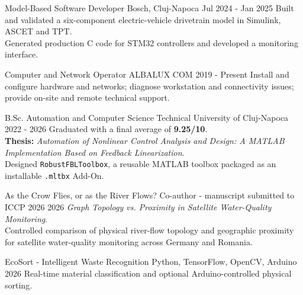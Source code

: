 \documentclass[10pt]{spidercv}
\begin{document}

\begin{MainPart}

  \Experience
    {\ColorHighlight}
    {Model-Based Software Developer}
    {Bosch, Cluj-Napoca}
    {\textcolor{\ColorTextMain}{Jul 2024 - Jan 2025}}
    {Built and validated a six-component electric-vehicle drivetrain model in Simulink, ASCET and TPT.\\
     Generated production C code for STM32 controllers and developed a monitoring interface.}

  \Experience
    {\ColorHighlight}
    {Computer and Network Operator}
    {ALBALUX COM}
    {\textcolor{\ColorTextMain}{2019 - Present}}
    {Install and configure hardware and networks; diagnose workstation and connectivity issues; provide on-site and remote technical support.}

  \Experience
    {\ColorHighlight}
    {B.Sc. Automation and Computer Science}
    {Technical University of Cluj-Napoca}
    {\textcolor{\ColorTextMain}{2022 - 2026}}
    {Graduated with a final average of \textbf{9.25/10}.\\
     \textbf{Thesis:} \textit{Automation of Nonlinear Control Analysis and Design: A MATLAB Implementation Based on Feedback Linearization}.\\
     Designed \texttt{RobustFBLToolbox}, a reusable MATLAB toolbox packaged as an installable \texttt{.mltbx} Add-On.}

  \Experience
    {\ColorHighlight}
    {As the Crow Flies, or as the River Flows?}
    {Co-author - manuscript submitted to ICCP 2026}
    {\textcolor{\ColorTextMain}{2026}}
    {\textit{Graph Topology vs. Proximity in Satellite Water-Quality Monitoring}.\\
     Controlled comparison of physical river-flow topology and geographic proximity for satellite water-quality monitoring across Germany and Romania.}

  \Experience
    {\ColorHighlight}
    {EcoSort - Intelligent Waste Recognition}
    {Python, TensorFlow, OpenCV, Arduino}
    {\textcolor{\ColorTextMain}{2026}}
    {Real-time material classification and optional Arduino-controlled physical sorting.}


\end{MainPart}
\end{document}
